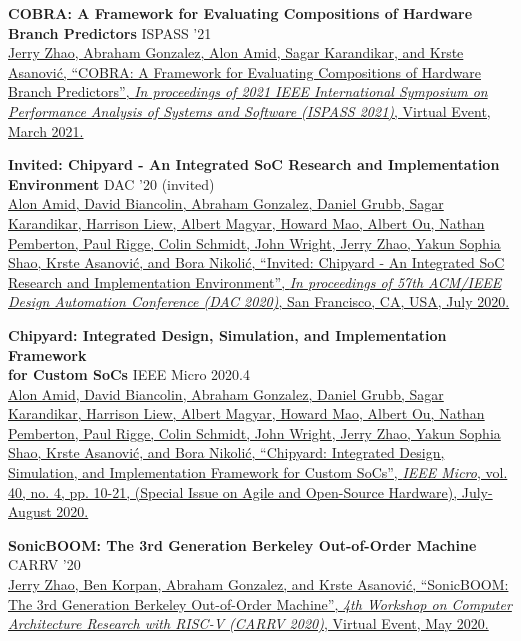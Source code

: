 \documentclass[line]{res}
\begin{document}
\begin{resume}
\textbf{COBRA: A Framework for Evaluating Compositions of Hardware Branch Predictors} \hfill ISPASS '21
\vspace{0.7mm}
\\
\href{https://ieeexplore.ieee.org/document/9408173}{Jerry Zhao, \underline{Abraham Gonzalez}, Alon Amid, Sagar Karandikar, and Krste Asanovi\'c, ``COBRA: A Framework for Evaluating Compositions of Hardware Branch Predictors'', \textit{In proceedings of 2021 IEEE International Symposium on Performance Analysis of Systems and Software (ISPASS 2021)}, Virtual Event, March 2021.}
\vspace{-1mm}

\textbf{Invited: Chipyard - An Integrated SoC Research and Implementation Environment} \hfill DAC '20 (invited)
\vspace{0.7mm}
\\
\href{https://dl.acm.org/doi/10.5555/3437539.3437682}{Alon Amid, David Biancolin, \underline{Abraham Gonzalez}, Daniel Grubb, Sagar Karandikar, Harrison Liew, Albert Magyar, Howard Mao, Albert Ou, Nathan Pemberton, Paul Rigge, Colin Schmidt, John Wright, Jerry Zhao, Yakun Sophia Shao, Krste Asanovi\'c, and Bora Nikoli\'c, ``Invited: Chipyard - An Integrated SoC Research and Implementation Environment'', \textit{In proceedings of 57th ACM/IEEE Design Automation Conference (DAC 2020)}, San Francisco, CA, USA, July 2020.}
\vspace{-1mm}

\textbf{Chipyard: Integrated Design, Simulation, and Implementation Framework\\for Custom SoCs} \hfill IEEE Micro 2020.4
\vspace{0.7mm}
\\
\href{https://dl.acm.org/doi/10.1109/MM.2020.2996616}{Alon Amid, David Biancolin, \underline{Abraham Gonzalez}, Daniel Grubb, Sagar Karandikar, Harrison Liew, Albert Magyar, Howard Mao, Albert Ou, Nathan Pemberton, Paul Rigge, Colin Schmidt, John Wright, Jerry Zhao, Yakun Sophia Shao, Krste Asanovi\'c, and Bora Nikoli\'c, ``Chipyard: Integrated Design, Simulation, and Implementation Framework for Custom SoCs'', \textit{IEEE Micro}, vol. 40, no. 4, pp. 10-21, (Special Issue on Agile and Open-Source Hardware), July-August 2020.}
\vspace{-1mm}

\textbf{SonicBOOM: The 3rd Generation Berkeley Out-of-Order Machine} \hfill CARRV '20
\vspace{0.7mm}
\\
\href{https://carrv.github.io/2020/papers/CARRV2020_paper_15_Zhao.pdf}{Jerry Zhao, Ben Korpan, \underline{Abraham Gonzalez}, and Krste Asanovi\'c, ``SonicBOOM: The 3rd Generation Berkeley Out-of-Order Machine'', \textit{4th Workshop on Computer Architecture Research with RISC-V (CARRV 2020)}, Virtual Event, May 2020.}
\vspace{-1mm}


\end{resume}
\end{document}

